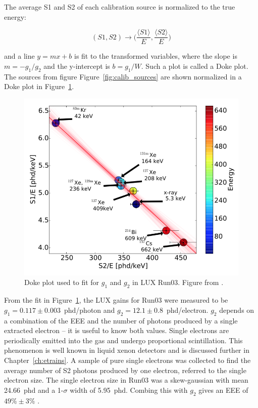 The average S1 and S2 of each calibration source is normalized to the true energy:

\begin{equation}
(S1, S2) \longrightarrow \Big(\frac{\langle S1 \rangle}{E}, \frac{\langle S2 \rangle}{E}\Big)
\end{equation}

and a line $y = mx + b$ is fit to the transformed variables, where the slope is $m = -g_{1} / g_{2}$ and the y-intercept is $b = g_{1} / W$. Such a plot is called a Doke plot. The sources from figure Figure~\ref{fig:calib_sources} are shown normalized in a Doke plot in Figure~\ref{fig:doke}.

\begin{figure}[htbp]
\begin{center}
\includegraphics[width=\textwidth]{figures/lux/doke.png}
\caption{ Doke plot used to fit for $g_{1}$ and $g_{2}$ in \acs{LUX} Run03. Figure from \cite{LUX:Run03Comprehensive}.}
\label{fig:doke}
\end{center}
\end{figure}

From the fit in Figure~\ref{fig:doke}, the \ac{LUX} gains for Run03 were measured to be $g_{1} = 0.117 \pm 0.003$~phd/photon and $g_{2} = 12.1 \pm 0.8$~phd/electron. $g_{2}$ depends on a combination of the \ac{EEE} and the number of photons produced by a single extracted electron -- it is useful to know both values. Single electrons are periodically emitted into the gas and undergo proportional scintillation. This phenomenon is well known in liquid xenon detectors and is discussed further in Chapter~\ref{ch:etrains}. A sample of pure single electrons was collected to find the average number of S2 photons produced by one electron, referred to the single electron size. The single electron size in Run03 was a skew-gaussian with mean 24.66~phd and a 1-$\sigma$ width of 5.95~phd. Combing this with $g_{2}$ gives an \ac{EEE} of $49\% \pm 3\%$ \cite{LUX:Run03Comprehensive}.

